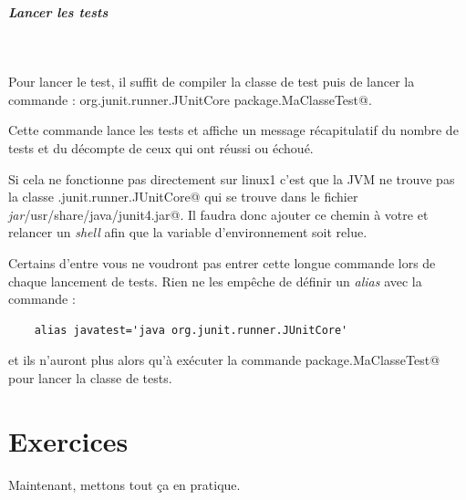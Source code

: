\documentclass[11pt,a4paper]{article}
\begin{document}
            \par
        
			
		\subparagraph{Lancer les tests} 
		
					\textcolor{white}{.} \par
				
            \par
        
					Pour lancer le test, il suffit de compiler la classe de test puis de lancer la commande : 
					\verb@java org.junit.runner.JUnitCore package.MaClasseTest@.
				
            \par
        
					Cette commande lance les tests 
					et affiche un message r\'ecapitulatif du nombre de tests
					et du d\'ecompte de ceux qui ont r\'eussi ou \'echou\'e.
				
            \par
        
					Si cela ne fonctionne pas directement sur linux1 
					c'est que la JVM ne trouve pas la classe
					\verb@org.junit.runner.JUnitCore@ 
					qui se trouve dans le fichier 
					\textit{jar}\verb@/usr/share/java/junit4.jar@.
					Il faudra donc ajouter ce chemin 
					\`a votre \verb@CLASSPATH@ 
					et relancer un \textit{shell} 
					afin que la variable d'environnement soit relue.
				
            \par
        
					Certains d'entre vous ne voudront pas 
					entrer cette longue commande lors de chaque 
					lancement de tests.    
					Rien ne les emp\^eche de d\'efinir un 
					\textit{alias} avec la commande :
				
            \par
        \begin{verbatim}
	alias javatest='java org.junit.runner.JUnitCore'
				\end{verbatim}
					et ils n'auront plus alors qu'\`a ex\'ecuter la commande
					\verb@javatest package.MaClasseTest@
					pour lancer la classe de tests.
				
            \par
        \section{Exercices}
				Maintenant, mettons tout \c ca en pratique.
      
            \par
\end{document}
